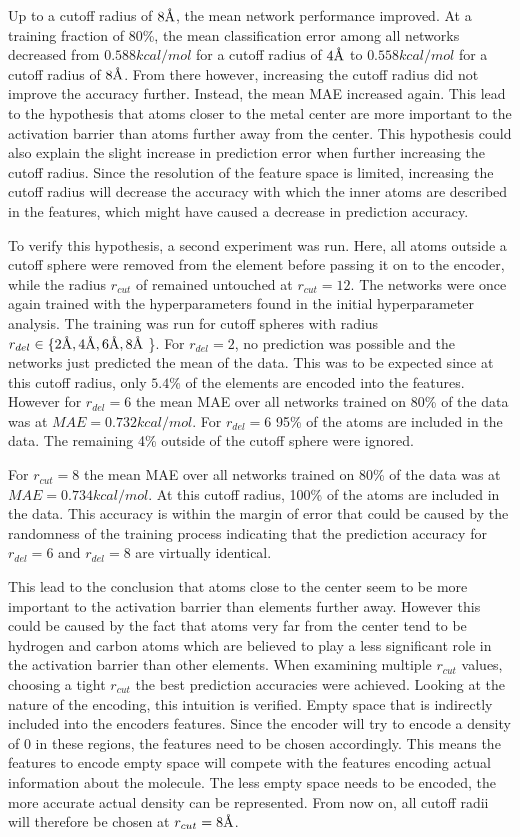 Up to a cutoff radius of $8 \AA$, the mean network performance improved. 
At a training fraction of 80\%, the mean classification error among 
all networks decreased from $0.588 kcal/mol$ for a cutoff radius of $4 \AA$ to 
$0.558 kcal/mol$ for a cutoff radius of $8 \AA$.
From there however, increasing the cutoff radius did not improve the accuracy further.
Instead, the mean MAE increased again.
This lead to the hypothesis that atoms closer to the metal center are more important to the activation barrier than atoms further away from the center.
This hypothesis could also explain the slight increase in prediction error when further increasing the cutoff radius.
Since the resolution of the feature space is limited, increasing the cutoff radius will decrease the accuracy 
with which the inner atoms are described in the features, which might have caused a decrease in prediction accuracy.

To verify this hypothesis, a second experiment was run.
Here, all atoms outside a cutoff sphere were removed from the element before passing it on to the encoder,
while the radius $r_{cut}$ of remained untouched at $r_{cut}=12$.
The networks were once again trained with the hyperparameters found in the initial hyperparameter analysis.
The training was run for cutoff spheres with radius $r_{del} \in \{2\AA, 4\AA, 6\AA, 8\AA$ \}.
For $r_{del}=2$, no prediction was possible and the networks just predicted the mean of the data.
This was to be expected since at this cutoff radius, only $5.4\%$ of the elements are encoded into the features.
However for $r_{del}=6$ the mean MAE over all networks trained on 80\% of the data was at $MAE = 0.732 kcal/mol$. 
For $r_{del} = 6$ 95\% of the atoms are included in the data. 
The remaining 4\% outside of the cutoff sphere were ignored. 

For $r_{cut}=8$ the mean MAE over all networks trained on 80\% of the data was at $MAE = 0.734 kcal/mol$. 
At this cutoff radius, 100\% of the atoms are included in the data.
This accuracy is within the margin of error that could be caused by the randomness of the training process
indicating that the prediction accuracy for $r_{del} = 6$ and $r_{del} = 8$ are virtually identical.

This lead to the conclusion that atoms close to the center seem to be more important to the activation barrier than 
elements further away.
However this could be caused by the fact that atoms very far from the center tend to be hydrogen and carbon 
atoms which are believed to play a less significant role in the activation barrier than other elements.
When examining multiple $r_{cut}$ values, choosing a tight $r_{cut}$ the best prediction accuracies were achieved.
Looking at the nature of the encoding, this intuition is verified.
Empty space that is indirectly included into the encoders features.
Since the encoder will try to encode a density of 0 in these regions,
the features need to be chosen accordingly.
This means the features to encode empty space will compete with the features encoding
actual information about the molecule.
The less empty space needs to be encoded, the more accurate actual density can be represented.
From now on, all cutoff radii will therefore be chosen at $r_{cut} = 8 \AA$.


